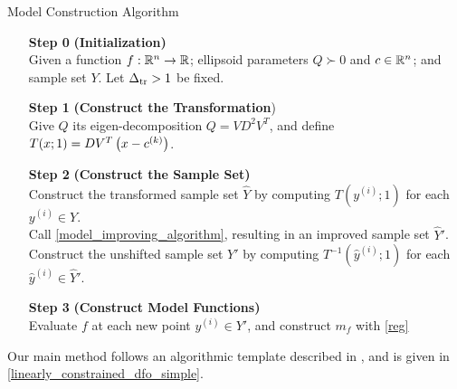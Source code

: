\documentclass{article}
\begin{document}
{
\begin{fullwidth}[leftmargin=0in, rightmargin=0in, width=\linewidth-0.5in]
\begin{flushleft}

\begin{algorithm}[H]
    \caption{Model Construction Algorithm}
    \label{model_construction_algorithm}
    \begin{itemize}
        \item[\textbf{Step 0}] \textbf{(Initialization)} \\
			Given a function $f : \mathbb R^n \to \mathbb R$;
			ellipsoid parameters $Q \succ 0$ and $c \in \mathbb R^n$;
        	and sample set $Y$.  Let $\Delta_{\textrm{tr}} > 1$ be fixed.
        \item[\textbf{Step 1}] \textbf{(Construct the Transformation}) \\
        	Give $Q$ its eigen-decomposition $Q = VD^2V^T$, and define
			$T(x; 1) =  D V^T\left(x - c^{(k)}\right)$.

        \item[\textbf{Step 2}] \textbf{(Construct the Sample Set)} \\
        Construct the transformed sample set $\hat Y$ by computing $T\left(y^{(i)}; 1\right)$ for each $y^{(i)} \in Y$. \\
        Call \cref{model_improving_algorithm}, resulting in an improved sample set $\hat{Y}'$.
        Construct the unshifted sample set $Y'$ by computing $T^{-1}\left(\hat y^{(i)}; 1 \right)$ for each $\hat y^{(i)} \in \hat Y'$.
        \item[\textbf{Step 3}] \textbf{(Construct Model Functions)} \\
        Evaluate $f$ at each new point $y^{(i)} \in Y'$, and construct $m_f$ with \cref{reg}
    \end{itemize}
\end{algorithm}


\end{flushleft}
\end{fullwidth}
}





Our main method follows
an algorithmic template described in \cite{Conejo:2013:GCT:2620806.2621814}, and is given in \cref{linearly_constrained_dfo_simple}.  
\end{document}
